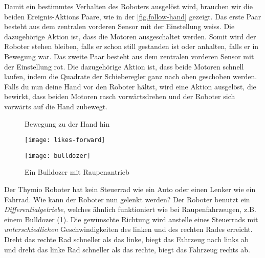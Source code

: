 
Damit  ein bestimmtes Verhalten des Roboters ausgelöst wird, 
brauchen wir die beiden Ereignis-Aktions Paare, 
wie in der \cref{fig.follow-hand} gezeigt. 
Das erste Paar besteht aus dem zentralen vorderen Sensor mit der Einstellung weiss. 
Die dazugehörige Aktion ist, dass die Motoren ausgeschaltet werden. 
Somit wird der Roboter stehen bleiben, falls er schon still gestanden ist oder anhalten, 
falls er in Bewegung war. 
Das zweite Paar besteht aus dem zentralen vorderen Sensor mit der Einstellung rot. 
Die dazugehörige Aktion ist, dass beide Motoren schnell laufen, indem die Quadrate der Schieberegler ganz nach oben geschoben werden. 
Falls du nun deine Hand vor den Roboter hältst, wird eine Aktion ausgelöst, die bewirkt, 
dass beiden Motoren rasch vorwärtsdrehen und  der Roboter sich vorwärts auf die Hand zubewegt.


\begin{figure}
\begin{floatrow}
	\ffigbox
	{\caption{Bewegung zu der Hand hin}\label{fig.follow-hand}}
	{\texttt{[image: likes-forward]}}
	\ffigbox
	{\caption{Ein Bulldozer mit Raupenantrieb}\label{fig.bull}}
	{\texttt{[image: bulldozer]}}
\end{floatrow}
\end{figure}


Der Thymio Roboter hat kein Steuerrad wie ein Auto oder einen Lenker wie ein Fahrrad.
Wie kann der Roboter nun gelenkt werden? Der Roboter benutzt ein \emph{Differentialgetriebe},
welches ähnlich funktioniert wie bei Raupenfahrzeugen, z.B. einem Bulldozer (\cref{fig.bull}).
Die gewünschte Richtung wird anstelle eines Steuerrads mit \emph{unterschiedlichen} Geschwindigkeiten
des linken und des rechten Rades erreicht. Dreht das rechte Rad schneller als das linke,
biegt das Fahrzeug nach links ab und dreht das linke Rad schneller als das rechte, biegt das Fahrzeug rechts ab.


